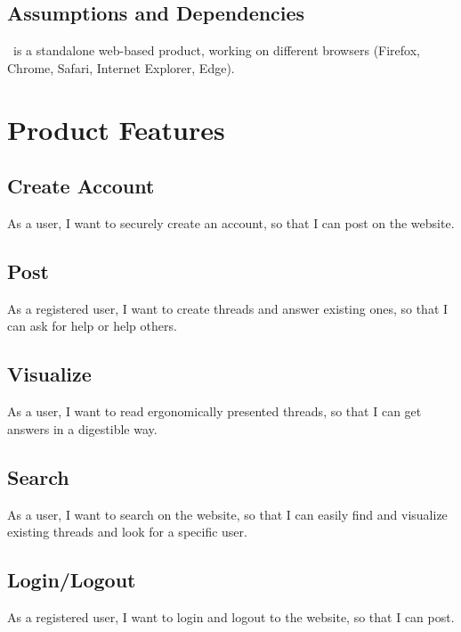 \documentclass [a4paper, 11pt]{article}
\newcommand \projectname{\mbox{\bsc{Academi-co}}}
\begin{document}
\subsection{Assumptions and Dependencies}
\projectname \ is a standalone web-based product, working on different browsers (Firefox, Chrome, Safari, Internet Explorer, Edge).




\section{Product Features}
\subsection{Create Account}
As a user, I want to securely create an account, so that I can post on the website.

\subsection{Post}
As a registered user, I want to create threads and answer existing ones, so that I can ask for help or help others.

\subsection{Visualize}
As a user, I want to read ergonomically presented threads, so that I can get answers in a digestible way.

\subsection{Search}
As a user, I want to search on the website, so that I can easily find and visualize existing threads and look for a specific user.

\subsection{Login/Logout}
As a registered user, I want to login and logout to the website, so that I can post.
\end{document}
